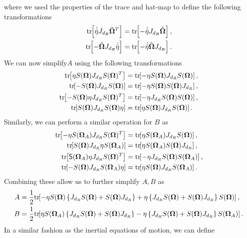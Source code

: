 where we used the properties of the trace and hat-map to define the following transformations
\begin{align*}
    \mathrm{tr}\negthickspace\left[ \dot{\hat{\eta}} J_{d_{R}} \hat{\bm{\Omega}}^T \right] &= \mathrm{tr}\negthickspace\left[ - \dot{\hat{\eta}} J_{d_{R}} \hat{\bm{\Omega}} \right] , \\
    \mathrm{tr}\negthickspace\left[  - \hat{\bm{\Omega}} J_{d_{R}} \dot{\hat{\eta}}  \right] &= \mathrm{tr}\negthickspace\left[ -\dot{\hat{\eta}} \hat{\bm{\Omega}} J_{d_{R}} \right] .
\end{align*}
We can now simplify\( A \) using the following transformations
\begin{align*}
    \tr{ \eta S(\vb{\Omega}) J_{d_{R}} S(\vb{\Omega})^T} &= \tr{-\eta S(\vb{\Omega}) J_{d_{R}} S(\vb{\Omega})} , \\
    \tr{ - S(\vb{\Omega}) J_{d_{R}} S(\vb{\Omega})} &= \tr{-\eta S(\vb{\Omega}) S(\vb{\Omega}) J_{d_{R}}} , \\
    \tr{ -S(\vb{\Omega}) \eta J_{d_{R}} S(\vb{\Omega})^T} &= \tr{-\eta J_{d_{R}} S(\vb{\Omega}) S(\vb{\Omega})} , \\
    \tr{ S(\vb{\Omega}) J_{d_{R}} S(\vb{\Omega}) \eta} &= \tr{\eta S(\vb{\Omega}) J_{d_{R}} S(\vb{\Omega})}.
\end{align*}
Similarly, we can perform a similar operation for \( B \) as
\begin{align*}
    \tr{-\eta S(\vb{\Omega}_A) J_{d_{R}} S(\vb{\Omega})^T} &= \tr{\eta S(\vb{\Omega}_A) J_{d_{R}} S(\vb{\Omega})} , \\
    \tr{ S(\vb{\Omega}) J_{d_{R}} \eta S(\vb{\Omega}_A)} &= \tr{\eta S(\vb{\Omega}_A) S(\vb{\Omega}) J_{d_{R}}} , \\
    \tr{\S(\vb{\Omega}_A) \eta J_{d_{R}} S(\vb{\Omega})^T} &= \tr{-\eta J_{d_{R}} S(\vb{\Omega}) S(\vb{\Omega}_A)} , \\
    \tr{-S(\vb{\Omega}) J_{d_{R}} S(\vb{\Omega}_A) \eta} &= \tr{\eta S(\vb{\Omega}) J_{d_{R}} S(\vb{\Omega}_A)} .
\end{align*}
Combining these allow us to further simplify \( A,B \) as
\begin{align*}
    A &= \frac{1}{2} \mathrm{tr}\negthickspace\left[  -\eta S(\bm{\Omega}) \left\{ J_{d_{R}} S(\bm{\Omega}) + S(\bm{\Omega}) J_{d_{R}} \right\} + \eta \left\{ J_{d_{R}} S(\bm{\Omega}) + S(\bm{\Omega}) J_{d_{R}} \right\} S(\bm{\Omega}) \right] , \\
    B &= \frac{1}{2} \mathrm{tr}\negthickspace\left[  \eta S(\bm{\Omega}_A) \left\{ J_{d_{R}} S(\bm{\Omega}) + S(\bm{\Omega}) J_{d_{R}} \right\} - \eta \left\{ J_{d_{R}} S(\bm{\Omega}) + S(\bm{\Omega}) J_{d_{R}} \right\} S(\bm{\Omega}_A)  \right] .
\end{align*}
In a similar fashion as the inertial equations of motion, we can define
